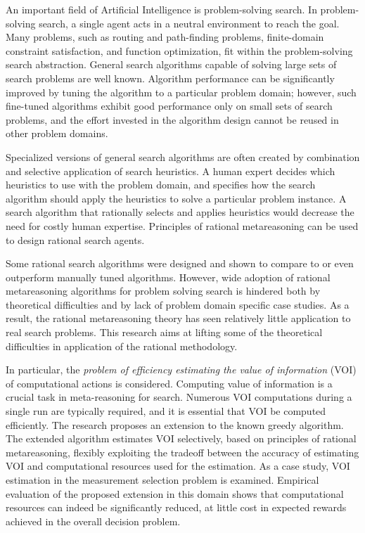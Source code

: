An important field of Artificial Intelligence is
problem-solving search. In problem-solving search, a single agent acts
in a neutral environment to reach the goal. Many problems, such as
routing and path-finding problems, finite-domain constraint
satisfaction, and function optimization, fit within the problem-solving
search abstraction. General search algorithms capable of solving large
sets of search problems are well known. Algorithm performance can be
significantly improved by tuning the algorithm to a particular problem
domain; however, such fine-tuned algorithms exhibit good performance
only on small sets of search problems, and the effort invested in the
algorithm design cannot be reused in other problem domains.

Specialized versions of general search algorithms are often created by
combination and selective application of search  heuristics.
A human expert decides which heuristics to use with the
problem domain, and specifies how the search algorithm should apply
the heuristics to solve a particular problem instance. A search
algorithm that rationally selects and applies heuristics would decrease
the need for costly human expertise. Principles of rational
metareasoning can be used to design rational search agents.  

Some rational search algorithms were designed and shown to compare to
or even outperform manually tuned algorithms. However, wide adoption
of rational metareasoning algorithms for problem solving search is
hindered both by theoretical difficulties and by lack of problem
domain specific case studies. As a result, the rational metareasoning
theory has seen relatively little application to real search
problems. This research aims at lifting some of the theoretical
difficulties in application of the rational methodology. 

In particular, the \emph{problem of efficiency estimating the value of
information} (VOI) of computational actions is considered. Computing value of
information is a crucial task in meta-reasoning for search. Numerous
VOI computations during a single run are typically required, and it is
essential that VOI be computed efficiently. The research proposes
an extension to the known greedy algorithm. The extended algorithm
estimates VOI selectively, based on principles of rational
metareasoning, flexibly exploiting the tradeoff between the
accuracy of estimating VOI and computational resources used for the
estimation. As a case study, VOI estimation in the measurement selection
problem is examined.  Empirical evaluation of the proposed extension in this
domain shows that computational resources can indeed be significantly
reduced, at little cost in expected rewards achieved in the overall
decision problem.

